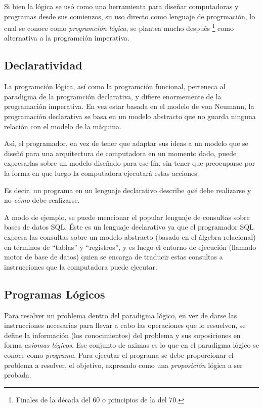 \documentclass{article}
\begin{document}
Si bien la lógica se usó como una herramienta para diseñar computadoras y programas desde sus comienzos, su uso directo como lenguaje de progrmación, lo cual se conoce como \emph{programción lógica}, se plantea mucho después \footnote{Finales de la década del 60 o principios de la del 70.} como alternativa a la programción imperativa.

\subsection{Declaratividad}

La programción lógica, así como la programción funcional, perteneca al paradigma de la programción declarativa, y difiere enormemente de la programación imperativa. En vez estar basada en el modelo de von Neumann, la programación declarativa se basa en un modelo abstracto que no guarda ninguna relación con el modelo de la máquina. 

Así, el programador, en vez de tener que adaptar sus ideas a un modelo que se diseñó para una arquitectura de computadora en un momento dado, puede expresarlas sobre un modelo diseñado para ese fín, sin tener que preocuparse por la forma en que luego la computadora ejecutará estas acciones. 

Es decir, un programa en un lenguaje declarativo describe \emph{qué} debe realizarse y no \emph{cómo} debe realizarse.

A modo de ejemplo, se puede mencionar el popular lenguaje de consultas sobre bases de datos SQL. Éste es un lenguaje declarativo ya que el programador SQL expresa las consultas sobre un modelo abstracto (basado en el álgebra relacional) en términos de ``tablas'' y ``registros'', y es luego el entorno de ejecución (llamado motor de base de datos) quien se encarga de traducir estas consultas a instrucciones que la computadora puede ejecutar.

\subsection{Programas Lógicos}

Para resolver un problema dentro del paradigma lógico, en vez de darse las instrucciones necesarias para llevar a cabo las operaciones que lo resuelven, se define la información (los conocimientos) del problema y sus suposiciones en forma \emph{axiomas lógicos}. Ese conjunto de aximas es lo que en el paradigma lógico se conoce como \emph{programa}. Para ejecutar el programa se debe proporcionar el problema a resolver, el objetivo, expresado como una \emph{proposición} lógica a ser probada. 
\end{document}
